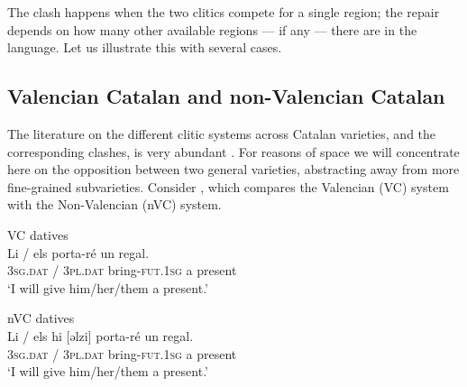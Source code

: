 \documentclass[output=paper,modfonts,nonflat,newtxmath,colorlinks,citecolor=brown]{langsci/langscibook}
\begin{document}
The clash happens when the two clitics compete for a single region; the repair depends on how many other available regions — if any — there are in the language. Let us illustrate this with several cases.

\subsection{Valencian Catalan and non-Valencian Catalan} %
\label{sec:cabre:3.1}

The literature on the different clitic systems across Catalan varieties, and the corresponding clashes, is very abundant \citep{Bonet1993, Martin2012}. For reasons of space we will concentrate here on the opposition between two general varieties, abstracting away from more fine-grained subvarieties. Consider , which compares the Valencian (VC) system with the Non-Valencian (nVC) system.

\ea%
    \label{ex:cabre:9}
    \ea VC datives \\
    \gll Li / els porta-ré un regal.\\
        \textsc{3sg}.\textsc{dat} / \textsc{3pl.dat} bring-\textsc{fut.1sg} a present\\
    \glt ‘I will give him/her/them a present.’

    \ex nVC datives\\
    \gll Li / {els hi [ǝlzi]} porta-ré  un regal.\\
    \textsc{3sg.dat} / \textsc{3pl.dat} bring-\textsc{fut.1sg} a present\\
    \glt ‘I will give him/her/them a present.’
    \z
    \z
\end{document}
